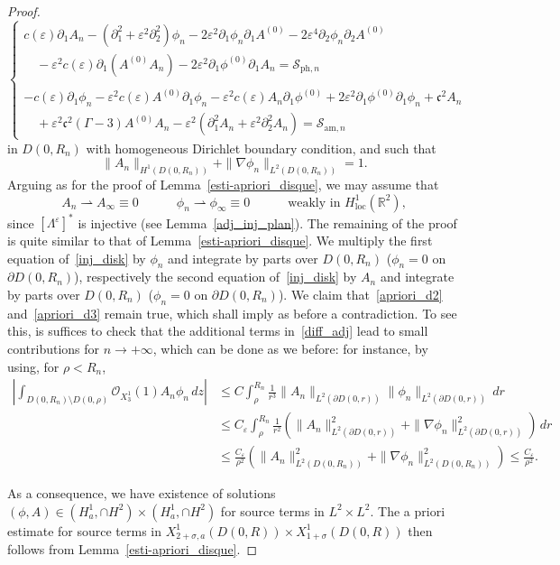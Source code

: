 \documentclass[AHL,Unicode,longabstracts,published]{cedram}
\newcommand*\p{\partial}
\newcommand*\R{\mathbb R}
\newcommand{\amm}{\mathrm{am}}
\newcommand{\phl}{\mathrm{ph}}
\newcommand{\locc}{\mathrm{loc}}
\newcommand*\BO{\mathcal{O}}
\newcommand*\BS{\mathcal{S}}
\newcommand*\cs{{\mathfrak c}}
\newcommand*\ii{\infty}
\newcommand*\ls{\leqslant }
\newcommand*\e{\varepsilon}
\newcommand*\s{\sigma}
\begin{document}
\begin{proof}
\begin{equation}\label{inj_disk}
\left\{
\begin{array}{ll}
c(\e) \p_{1} A_n - \left(\p_{1}^2 + \e^2 \p^2_{2}\right) \phi_n - 2 \e^2 \p_{1} \phi_n \p_{1} A^{(0)} - 2 \e^4 \p_{2} \phi_n \p_{2} A^{(0)}
\\
\quad - \e^2 c(\e) \p_1 (A^{(0)} A_n) - 2 \e^2 \p_{1} \phi^{(0)} \p_{1} A_n = \BS_{{\phl},n} \\ \ \\
- c(\e) \p_{1} \phi_n - \e^2 c(\e) A^{(0)} \p_1 \phi_n - \e^2 c(\e) A_n \p_1 \phi^{(0)} + 2 \e^2 \p_{1} \phi^{(0)} \p_{1} \phi_n + \cs^2 A_n
\\
\quad + \e^2 \cs^2 (\Gamma -3) A^{(0)} A_n - \e^2 \left(\p_{1}^2 A_n + \e^2 \p_{2}^2 A_n\right) = \BS_{{\amm},n}
\end{array}\right.
\end{equation}
in $ D(0,R_n) $ with homogeneous Dirichlet boundary condition, and such that
\begin{equation}\label{hyp1_disk_inj}
\| A_n \|_{ H^1 (D(0,R_n))} + \| \nabla \phi_n \|_{ L^2 (D(0,R_n))} = 1.
\end{equation}
Arguing as for the proof of Lemma~\ref{esti-apriori_disque}, we may assume that
\[
A_n \rightharpoonup A_\ii \equiv 0
\quad \quad \quad
\phi_n \rightharpoonup \phi_\ii \equiv 0
\quad \quad \quad
\text{weakly in } H^{1 }_{\locc} (\R^2),
\]
since $ [\Lambda^\e]^* $ is injective (see Lemma~\ref{adj_inj_plan}). The remaining of the proof is quite similar to that of Lemma~\ref{esti-apriori_disque}. We multiply the first equation of~\eqref{inj_disk} by $ \phi_n $ and integrate by parts over $ D(0, R_n) $ ($\phi_n= 0 $ on $ \p D(0,R_n) $), respectively the second equation of~\eqref{inj_disk} by $ A_n $ and integrate by parts over $ D(0, R_n) $ ($\phi_n= 0 $ on $ \p D(0,R_n) $). We claim that~\eqref{apriori_d2} and~\eqref{apriori_d3} remain true, which shall imply as before a contradiction. To see this, is suffices to check that the additional terms in~\eqref{diff_adj} lead to small contributions for $n \to +\ii $, which can be done as we before: for instance, by using, for $\rho < R_n$,
\begin{align*}
\left \lvert \int_{D(0,R_n) \setminus D(0, \rho) } \BO_{X^1_3} (1) A_n \phi_n \, dz \right \rvert & \ls C \int_\rho^{R_n} \frac{1}{r^3} \| A_n \|_{L^2(\p D(0,r))} \| \phi_n \|_{L^2(\p D(0,r))} \, d r
\\ & \ls C_\e \int_\rho^{R_n} \frac{1}{ r^2 } \left(\| A_n \|_{L^2(\p D(0,r))}^2 + \| \nabla \phi_n \|_{L^2(\p D(0,r))}^2\right) \, d r
\\ & \ls
\frac{C_\e}{ \rho^2 } \left(\| A_n \|_{L^2(D(0,R_n))}^2 + \| \nabla \phi_n \|_{L^2(D(0,R_n))}^2\right)
\ls \frac{C_\e}{ \rho^2 }.
\end{align*}

As a consequence, we have existence of solutions $ (\phi,A) \in (H^1_a, \cap H^2) \times (H^1_a, \cap H^2) $ for source terms in $ L^2 \times L^2 $. The a priori estimate for source terms in $ X^{1}_{ 2+\s, a} (D(0,R)) \times X^{ 1}_{1+\s} (D(0,R)) $ then follows from Lemma~\ref{esti-apriori_disque}.
\end{proof}
\end{document}
